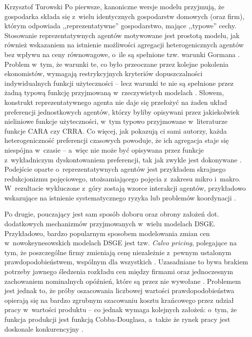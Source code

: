 \begin{artplenv}{Krzysztof Turowski}
Po pierwsze, kanoniczne wersje modelu przyjmują, że gospodarka składa się z~wielu identycznych gospodarstw domowych
(oraz firm), którym odpowiada ,,reprezentatywne'' gospodarstwo, mające ,,typowe'' cechy. Stosowanie reprezentatywnych
agentów motywowane jest prostotą modelu, jak również wskazaniem na istnienie możliwości agregacji heterogenicznych
agentów bez wpływu na ceny równowagowe, o~ile są spełnione tzw. warunki Gormana
\parencite{eichenbaum_estimating_1990}.
Problem w~tym, że warunki te, co było przeoczane przez kolejne pokolenia ekonomistów, wymagają
restrykcyjnych kryteriów dopuszczalności indywidualnych funkcji użyteczności  --  lecz warunki te nie są
spełnione przez żadną typową funkcję przyjmowaną w~rzeczywistych modelach
\parencite{jackson_non-existence_2017}.
Słowem, konstrukt reprezentatywnego agenta nie daje się przełożyć na żaden układ preferencji jednostkowych
agentów, którzy byliby opisywani przez jakiekolwiek nieliniowe funkcje użyteczności, w~tym typowo
przyjmowane w~literaturze funkcje CARA czy CRRA. Co więcej, jak pokazują ci sami autorzy, każda heterogeniczność preferencji
czasowych powoduje, że ich agregacja staje się niespójna w~czasie  --  a~więc nie może być opisywana przez
funkcje z~wykładniczym dyskontowaniem preferencji, tak jak zwykle jest dokonywane
\parencite{jackson_collective_2015}.
Podejście oparte o~reprezentatywnych agentów jest przykładem skrajnego redukcjonizmu pojęciowego,
utożsamiającego pojęcia z~zakresu mikro i~makro. W~rezultacie wykluczone z~góry zostają wzorce interakcji agentów,
przykładowo wskazujące na istnienie systematycznego ryzyka lub problemów koordynacji
\parencite{colander_financial_2009}.

Po drugie, pouczający jest sam sposób doboru oraz obrony założeń dot. dodatkowych mechanizmów przyjmowanych w~wielu
modelach DSGE. Przykładowo, bardzo popularnym sposobem modelowania zmian cen w~nowokeynesowskich modelach DSGE jest
tzw. \textit{Calvo pricing}, polegające na tym, że poszczególne firmy zmieniają cenę niezależnie z~pewnym ustalonym
prawdopodobieństwem, wspólnym dla wszystkich
\parencite{calvo_staggered_1983}.
Uzasadniane to bywa brakiem
potrzeby jawnego śledzenia rozkładu cen między firmami oraz jednoczesnym zachowaniem nominalnych opóźnień, które są
przez nie wywołane
\parencite{christiano_nominal_2005}.
Problemem jest jednak to, że próby oszacowania
liczbowej wartości prawdopodobieństwa opierają się na bardzo zgrubnym szacowaniu kosztu krańcowego przez udział
pracy w~wartości produktu  --  co jednak wymaga kolejnych założeń: o~tym, że funkcja produkcji jest funkcją
Cobba-Douglasa, a~także że rynek pracy jest doskonale konkurencyjny
\parencite{wolman_sticky_1999}.


\end{artplenv}

